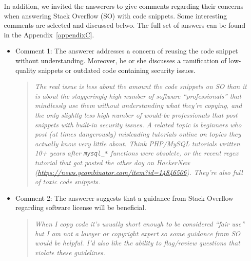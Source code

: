 \documentclass{svjour3}                     %
\begin{document}
\vspace{0.5cm}
\noindent{}
\vspace{0.5cm}


In addition, we invited the answerers to give comments regarding their concerns when answering Stack Overflow (SO) with code snippets. Some interesting comments are selected and discussed belwo. The full set of answers can be found in the Appendix~\ref{appendixC}.

\begin{itemize}[label={}]
	\itemsep1em
	\item Comment 1: The answerer addresses a concern of reusing the code snippet without understanding. Moreover, he or she discusses a ramification of low-quality snippets or outdated code containing security issues.
	
	\begin{quote}\textit{The real issue is less about the amount the code snippets on SO than it is about the staggeringly high number of software ``professionals'' that mindlessly use them without understanding what they're copying, and the only slightly less high number of would-be professionals that post snippets with built-in security issues.  A related topic is beginners who post (at times dangerously) misleading tutorials online on topics they actually know very little about. Think PHP/MySQL tutorials written 10+ years after \texttt{mysql\_*} functions were obsolete, or the recent regex tutorial that got posted the other day on HackerNew (\url{https://news.ycombinator.com/item?id=14846506}). They're also full of toxic code snippets.}\end{quote}
	
	\item Comment 2: The answerer suggests that a guidance from Stack Overflow regarding software license will be beneficial.
	
	\begin{quote}\textit{When I copy code it's usually short enough to be considered ``fair use'' but I am not a lawyer or copyright expert so some guidance from SO would be helpful. I'd also like the ability to flag/review questions that violate these guidelines.}\end{quote}
	

\end{itemize}
\end{document}
